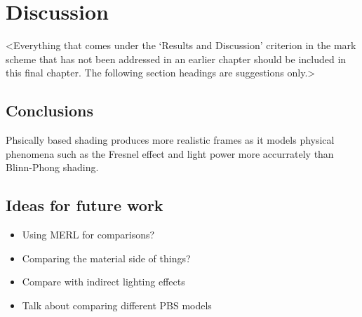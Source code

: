 \chapter{Discussion}
\label{chapter4}

<Everything that comes under the `Results and Discussion' criterion in the mark scheme that has not been addressed in an earlier chapter should be included in this final chapter. The following section headings are suggestions only.>

\section{Conclusions}
\lipsum[13]


Phsically based shading produces more realistic frames as it models physical phenomena such as the Fresnel effect and light power more accurrately than Blinn-Phong shading.

\section{Ideas for future work}

\begin{itemize}
	\item Using MERL for comparisons?
	\item Comparing the material side of things?
	\item Compare with indirect lighting effects
	\item Talk about comparing different PBS models
\end{itemize}

